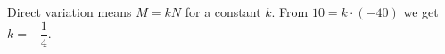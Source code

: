 Direct variation means $M=kN$ for a constant $k$. From $10=k\cdot(-40)$ we get $k=\boxed{-\dfrac14}$.
